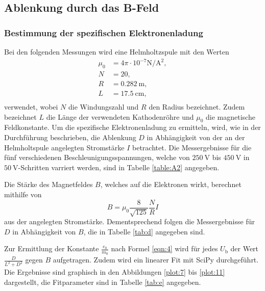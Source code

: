 \clearpage
\subsection{Ablenkung durch das B-Feld}
\subsubsection{Bestimmung der spezifischen Elektronenladung}
Bei den folgenden Messungen wird eine Helmholtzspule mit den Werten
\begin{align*}
  \mu_0 &= 4\pi \cdot 10^{-7}\si{\newton\per\ampere\tothe{2}},\\
  N    &= 20,\\
  R    &= \SI{0,282}{\metre} ,\\
  L    &= \SI{17,5}{\centi\metre} ,\\
\end{align*}
verwendet, wobei $N$ die Windungszahl und $R$ den Radius bezeichnet.
Zudem bezeichnet $L$ die Länge der verwendeten Kathodenröhre \cite{skript1} und $\mu_0$ die magnetische Feldkonstante.
Um die spezifische Elektronenladung zu ermitteln, wird, wie in der Durchführung beschrieben, die Ablenkung $D$ in Abhängigkeit von der an der Helmholtspule angelegten Stromstärke $I$ betrachtet.
Die Messergebnisse für die fünf verschiedenen Beschleunigungsspannungen, welche von $\SI{250}{\volt}$ bis $\SI{450}{\volt}$ in $\SI{50}{\volt}$-Schritten varriert werden, sind in Tabelle \ref{table:A2} angegeben.



Die Stärke des Magnetfeldes $B$, welches auf die Elektronen wirkt, berechnet mithilfe von
\begin{equation}
  B = \mu_0 \frac{8}{\sqrt{125}}\frac{N}{R} I
\end{equation}
aus der angelegten Stromstärke.
Dementsprechend folgen die Messergebnisse für $D$ in Abhängigkeit von $B$, die in Tabelle \ref{tab:d} angegeben sind.



Zur Ermittlung der Konstante $\frac{e_0}{m_0}$ nach Formel \eqref{eqn:4} wird für jedes $U_\text{b}$ der Wert $\frac{D}{L^2+D^2}$ gegen $B$ aufgetragen.
Zudem wird ein linearer Fit mit SciPy durchgeführt.
Die Ergebnisse sind graphisch in den Abbildungen \ref{plot:7} bis \ref{plot:11} dargestellt, die Fitparameter sind in Tabelle \ref{tab:e} angegeben.




